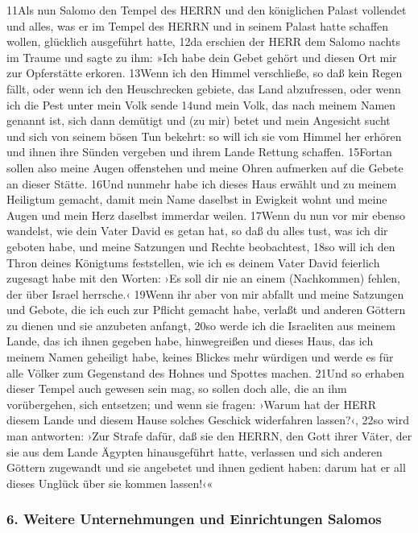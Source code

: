 11Als nun Salomo den Tempel des HERRN und den königlichen Palast
vollendet und alles, was er im Tempel des HERRN und in seinem Palast
hatte schaffen wollen, glücklich ausgeführt hatte, 12da erschien der
HERR dem Salomo nachts im Traume und sagte zu ihm: »Ich habe dein Gebet
gehört und diesen Ort mir zur Opferstätte erkoren. 13Wenn ich den Himmel
verschließe, so daß kein Regen fällt, oder wenn ich den Heuschrecken
gebiete, das Land abzufressen, oder wenn ich die Pest unter mein Volk
sende 14und mein Volk, das nach meinem Namen genannt ist, sich dann
demütigt und (zu mir) betet und mein Angesicht sucht und sich von seinem
bösen Tun bekehrt: so will ich sie vom Himmel her erhören und ihnen ihre
Sünden vergeben und ihrem Lande Rettung schaffen. 15Fortan sollen also
meine Augen offenstehen und meine Ohren aufmerken auf die Gebete an
dieser Stätte. 16Und nunmehr habe ich dieses Haus erwählt und zu meinem
Heiligtum gemacht, damit mein Name daselbst in Ewigkeit wohnt und meine
Augen und mein Herz daselbst immerdar weilen. 17Wenn du nun vor mir
ebenso wandelst, wie dein Vater David es getan hat, so daß du alles
tust, was ich dir geboten habe, und meine Satzungen und Rechte
beobachtest, 18so will ich den Thron deines Königtums feststellen, wie
ich es deinem Vater David feierlich zugesagt habe mit den Worten: ›Es
soll dir nie an einem (Nachkommen) fehlen, der über Israel herrsche.‹
19Wenn ihr aber von mir abfallt und meine Satzungen und Gebote, die ich
euch zur Pflicht gemacht habe, verlaßt und anderen Göttern zu dienen und
sie anzubeten anfangt, 20so werde ich die Israeliten aus meinem Lande,
das ich ihnen gegeben habe, hinwegreißen und dieses Haus, das ich meinem
Namen geheiligt habe, keines Blickes mehr würdigen und werde es für alle
Völker zum Gegenstand des Hohnes und Spottes machen. 21Und so erhaben
dieser Tempel auch gewesen sein mag, so sollen doch alle, die an ihm
vorübergehen, sich entsetzen; und wenn sie fragen: ›Warum hat der HERR
diesem Lande und diesem Hause solches Geschick widerfahren lassen?‹,
22so wird man antworten: ›Zur Strafe dafür, daß sie den HERRN, den Gott
ihrer Väter, der sie aus dem Lande Ägypten hinausgeführt hatte,
verlassen und sich anderen Göttern zugewandt und sie angebetet und ihnen
gedient haben: darum hat er all dieses Unglück über sie kommen lassen!‹«

\hypertarget{weitere-unternehmungen-und-einrichtungen-salomos}{%
\subsubsection{6. Weitere Unternehmungen und Einrichtungen
Salomos}\label{weitere-unternehmungen-und-einrichtungen-salomos}}


